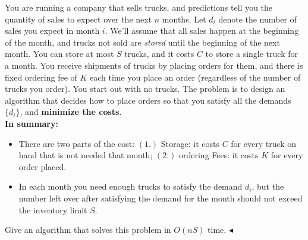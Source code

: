 \documentclass[11pt]{article}
\newenvironment{problem}[2][Problem]{\begin{trivlist}
\item[\hskip \labelsep{\bfseries#1}\hskip\labelsep{\bfseries#2.}]}{\hfill$\blacktriangleleft$\end{trivlist}}
\begin{document}
\begin{problem}{5 (Running a Sales Company)}
    You are running a company that sells trucks, and predictions 
    tell you the quantity of sales to expect over the next $n$ months.
    Let $d_i$ denote the number of sales you expect in month $i$. 
    We'll assume that all sales happen at the beginning of the 
    month, and trucks not sold are \textit{stored} until the beginning of 
    the next month. You can store at most $S$ trucks, and it 
    costs $C$ to store a single truck for a month. You receive 
    shipments of trucks by placing orders for them, and there is 
    fixed ordering fee of $K$ each time you place an order 
    (regardless of the number of trucks you order). You start out 
    with no trucks. The problem is to design an algorithm that 
    decides how to place orders so that you satisfy all the 
    demands $\{d_i\}$, and \textbf{minimize the costs}. \\
    \textbf{In summary:}
    \begin{itemize}
        \item There are two parts of the cost: $(1.)$ Storage: it costs $C$ 
        for every truck on hand that is not needed that month; $(2.)$ 
        ordering Fees: it costs $K$ for every order placed.
        \item In each month you need enough trucks to satisfy 
        the demand $d_i$, but the number left over after satisfying
         the demand for the month should not exceed the inventory 
         limit $S$.
    \end{itemize}
    Give an algorithm that solves this problem in $O(nS)$ time.
\end{problem}
\end{document}
